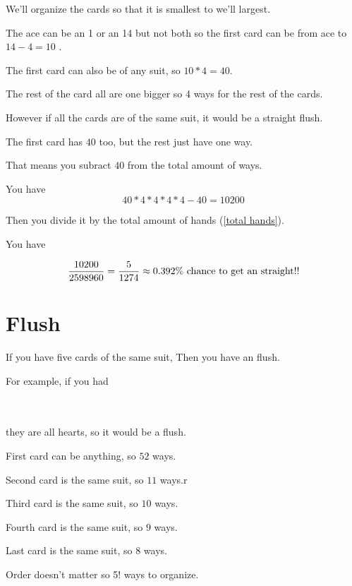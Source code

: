 \documentclass[12pt]{article}
\newcommand\redcard[2]{%
  \begingroup\fboxsep=0pt\relax
  \fbox{\color{red}\tabbedCenterstack{%
  \scriptsize$#2$ && \\&\makebox[10pt]{#1}&\\&&\rotatebox[origin=c]{180}{\scriptsize$#2$}}}%
  \endgroup}
\begin{document}
We'll organize the cards so that it is smallest to we'll largest.

The ace can be an 1 or an 14 but not both so the first card can be from ace to $ 14 - 4 = 10$ .

The first card can also be of any suit, so $ 10 * 4 = 40 $.

The rest of the card all are one bigger so 4 ways for the rest of the cards.

However if all the cards are of the same suit, it would be a straight flush.

The first card has $ 40 $ too, but the rest just have one way.

That means you subract $  40 $ from the total amount of ways.

You have
\begin{equation}
  40 * 4 * 4 * 4 * 4 - 40 = 10200
\end{equation}

Then you divide it by the total amount of hands (\ref{total hands}).

You have

\begin{equation}
  {10200 \over 2598960} = {5 \over 1274} \approx 0.392\% \hbox{ chance to get an straight!!}
\end{equation}

\section{Flush}

If you have five cards of the same suit, Then you have an flush.

For example, if you had

\redcard{5}{\heartsuit}
\redcard{7}{\heartsuit}
\redcard{9}{\heartsuit}
\redcard{J}{\heartsuit}
\redcard{A}{\heartsuit}
\\\\

they are all hearts, so it would be a flush.

First card can be anything, so $52$ ways.

Second card is the same suit, so $11$ ways.r

Third card is the same suit, so $10$ ways.

Fourth card is the same suit, so $9$ ways.

Last card is the same suit, so $8$ ways.

Order doesn't matter so 5! ways to organize.
\end{document}
